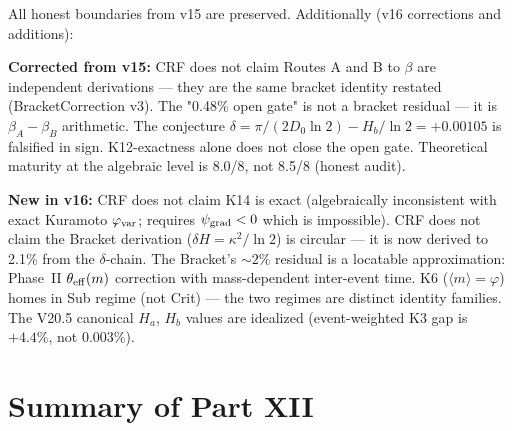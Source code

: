 \documentclass[12pt, a4paper]{article}
\begin{document}
All honest boundaries from v15 are preserved. Additionally (v16 corrections and additions):

\textbf{Corrected from v15:}
CRF does not claim Routes A and B to $\beta$ are independent derivations --- they are the same bracket identity restated (BracketCorrection v3). The "0.48\% open gate" is not a bracket residual --- it is $\beta_A - \beta_B$ arithmetic. The conjecture $\delta = \pi/(2D_0\ln 2) - H_b/\ln 2 = +0.00105$ is falsified in sign. K12-exactness alone does not close the open gate. Theoretical maturity at the algebraic level is 8.0/8, not 8.5/8 (honest audit).

\textbf{New in v16:}
CRF does not claim K14 is exact (algebraically inconsistent with exact Kuramoto $\varphi_{\rm var}$; requires $\psi_{\rm grad} < 0$ which is impossible). CRF does not claim the Bracket derivation ($\delta H = \kappa^2/\ln 2$) is circular --- it is now derived to 2.1\% from the $\delta$-chain. The Bracket's $\sim 2\%$ residual is a locatable approximation: Phase~II $\theta_{\rm eff}(m)$ correction with mass-dependent inter-event time. K6 ($\langle m\rangle = \varphi$) homes in Sub regime (not Crit) --- the two regimes are distinct identity families. The V20.5 canonical $H_a$, $H_b$ values are idealized (event-weighted K3 gap is $+4.4\%$, not $0.003\%$).

\section{Summary of Part XII}
\end{document}
